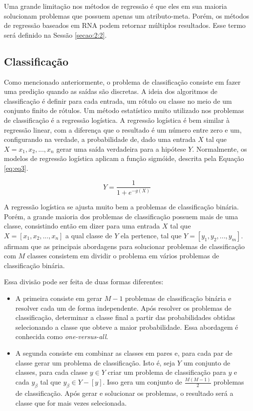 Uma grande limitação nos métodos de regressão é que eles em sua maioria solucionam problemas que possuem apenas um atributo-meta. Porém, os métodos de regressão baseados em \ac{RNA} podem retornar múltiplos resultados. Esse termo será definido na Sessão \ref{secao:2:2}.

\subsection{Classificação}
\label{subsecao:2:1:2}

Como mencionado anteriormente, o problema de classificação consiste em fazer uma predição quando as saídas são discretas. A ideia dos algoritmos de classificação é definir para cada entrada, um rótulo ou classe no meio de um conjunto finito de rótulos. Um método estatístico muito utilizado nos problemas de classificação é a regressão logística. A regressão logística é bem similar à regressão linear, com a diferença que o resultado é um número entre zero e um, configurando na verdade, a probabilidade de, dado uma entrada $X$ tal que $X = {x_1, x_2, ..., x_n}$ gerar uma saída verdadeira para a hipótese $Y$. Normalmente, os modelos de regressão logística aplicam a função sigmóide, descrita pela Equação  \ref{eq:eq3}.

\begin{equation}
\label{eq:eq3}
Y = \dfrac{1}{1 + e^{-g(X)}}
\end{equation}

A regressão logística se ajusta muito bem a problemas de classificação binária. Porém, a grande maioria dos problemas de classificação possuem mais de uma classe, consistindo então em dizer para uma entrada $X$ tal que $X = [x_1, x_2, ..., x_n]$ a qual classe de $Y$ ela pertence, tal que $Y = [y_1, y_2, ..., y_m]$.  afirmam que as principais abordagens para solucionar problemas de classificação com $M$ classes consistem em dividir o problema em vários problemas de classificação binária.

Essa divisão pode ser feita de duas formas diferentes: 
\begin{itemize}
	\item A primeira consiste em gerar $M - 1$ problemas de classificação binária e resolver cada um de forma independente. Após resolver os problemas de classificação, determinar a classe final a partir das probabilidades obtidas selecionando a classe que obteve a maior probabilidade. Essa abordagem é conhecida como \textit{one-versus-all}.
	\item A segunda consiste em combinar as classes em pares e, para cada par de classe gerar um problema de classificação. Isto é, seja $Y$ um conjunto de classes, para cada classe $y \in Y$ criar um problema de classificação para $y$ e  cada $y_\beta$ tal que $y_\beta \in Y - [y]$. Isso gera um conjunto de $\frac{M (M - 1)}{2}$ problemas de classificação. Após gerar e solucionar os problemas, o resultado será a classe que for mais vezes selecionada.
\end{itemize}

